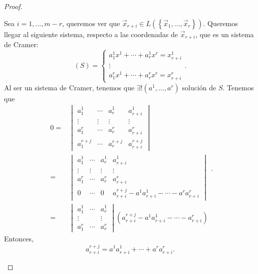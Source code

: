 \begin{proof}
\begin{description}
		Sea $\displaystyle i = 1, \ldots, m - r $, queremos ver que $\displaystyle \vec{x}_{r+i} \in L\left( \left\{ \vec{x}_{1}, \ldots, \vec{x}_{r}\right\} \right) $. Queremos llegar al siguiente sistema, respecto a las coordenadas de $\displaystyle \vec{x}_{r+i} $, que es un sistema de Cramer:
	\[ \left(S\right) =
	\begin{cases}
	a^{1}_{1}x^{1} + \cdots + a^{1}_{r}x^{r} = x^{1}_{r+i}\\
	\vdots \\
	a^{r}_{1}x^{1} + \cdots + a^{r}_{r}x^{r} = x^{r}_{r+i}
	\end{cases}
	.\]
Al ser un sistema de Cramer, tenemos que $\displaystyle \exists!\left(a^{1}, \ldots, a^{r}\right) $ solución de $\displaystyle S $. Tenemos que
\[
\begin{split}
	0 = & \begin{vmatrix} a^{1}_{1} & \cdots & a^{1}_{r} &  a^{1}_{r+i} \\
\vdots & \vdots & \vdots & \vdots \\
a^{r}_{1} & \cdots & a^{r}_{r}&  a^{r}_{r+i} \\
a^{r+j}_{1} & \cdots & a^{r+j}_{r}&  a^{r+j}_{r+i} \end{vmatrix} \\
		= & \begin{vmatrix} a^{1}_{1} & \cdots & a^{1}_{r} &  a^{1}_{r+i} \\
		\vdots & \vdots & \vdots & \vdots  \\
		a^{r}_{1} & \cdots & a^{r}_{r}&  a^{r}_{r+i} \\
0 & \cdots & 0 & a^{r+j}_{r+i} - a^{1}a^{1}_{r+i}-\cdots-a^{r}a^{r}_{r+i}\end{vmatrix} \\
			= & \begin{vmatrix} a^{1}_{1} & \cdots & a^{1}_{r} \\ \vdots & & \vdots \\
			a^{r}_{1} & \cdots & a^{r}_{r}\end{vmatrix} \left(a^{r+j}_{r+i}-a^{1}a^{1}_{r+i}-\cdots -a^{r}_{r+i}\right)
\end{split}
.\]
Entonces, 
\[a^{r+j}_{r+i} = a^{1}a^{1}_{r+i} + \cdots + a^{r}a^{r}_{r+i} .\]
\end{description}
\end{proof}

